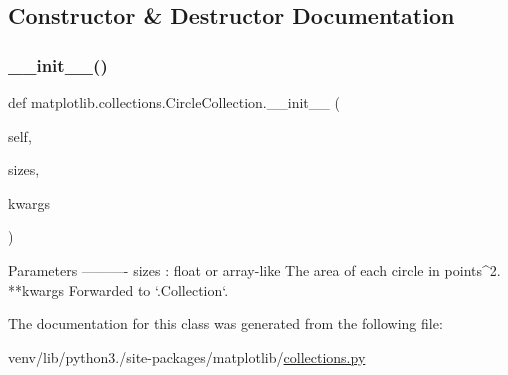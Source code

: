 \subsection{Constructor \& Destructor Documentation}
\mbox{\label{classmatplotlib_1_1collections_1_1CircleCollection_a992e50dbc51e40835e81f80bc1e263a5}} 
\subsubsection{\texorpdfstring{\+\_\+\+\_\+init\+\_\+\+\_\+()}{\_\_init\_\_()}}
{\footnotesize\ttfamily def matplotlib.\+collections.\+Circle\+Collection.\+\_\+\+\_\+init\+\_\+\+\_\+ (\begin{DoxyParamCaption}\item[{}]{self,  }\item[{}]{sizes,  }\item[{}]{kwargs }\end{DoxyParamCaption})}

\begin{DoxyVerb}Parameters
----------
sizes : float or array-like
    The area of each circle in points^2.
**kwargs
    Forwarded to `.Collection`.
\end{DoxyVerb}
 

The documentation for this class was generated from the following file\+:\begin{DoxyCompactItemize}
\item 
venv/lib/python3./site-\/packages/matplotlib/\hyperlink{collections_8py}{collections.\+py}\end{DoxyCompactItemize}
